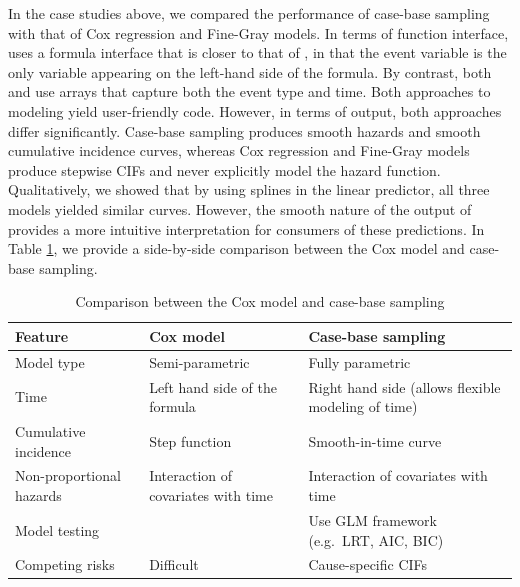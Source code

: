 \documentclass[
]{jss}
\begin{document}
In the case studies above, we compared the performance of case-base
sampling with that of Cox regression and Fine-Gray models. In terms of
function interface,  uses a formula interface that is
closer to that of , in that the event variable is the only
variable appearing on the left-hand side of the formula. By contrast,
both  and  use arrays
that capture both the event type and time. Both approaches to modeling
yield user-friendly code. However, in terms of output, both approaches
differ significantly. Case-base sampling produces smooth hazards and
smooth cumulative incidence curves, whereas Cox regression and Fine-Gray
models produce stepwise CIFs and never explicitly model the hazard
function. Qualitatively, we showed that by using splines in the linear
predictor, all three models yielded similar curves. However, the smooth
nature of the output of  provides a more intuitive
interpretation for consumers of these predictions. In Table
\ref{tab:compCBvsCox}, we provide a side-by-side comparison between the
Cox model and case-base sampling.

\begin{table}
\caption{\label{tab:compCBvsCox}Comparison between the Cox model and case-base sampling}
\centering
\begin{tabular}[t]{llp{5cm}}
\toprule
Feature & Cox model & Case-base sampling\\
\midrule
Model type & Semi-parametric & Fully parametric\\
Time & Left hand side of the formula & Right hand side (allows flexible modeling of time)\\
Cumulative incidence & Step function & Smooth-in-time curve\\
Non-proportional hazards & Interaction of covariates with time & Interaction of covariates with time\\
Model testing &  & Use GLM framework \newline (e.g.\ LRT, AIC, BIC)\\
\addlinespace
Competing risks & Difficult & Cause-specific CIFs\\
\bottomrule
\end{tabular}
\end{table}
\end{document}
